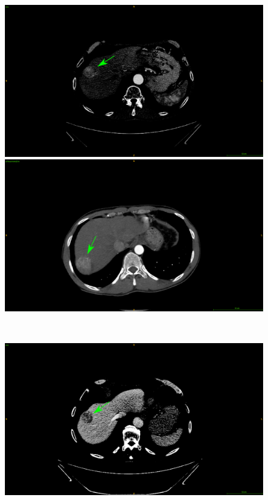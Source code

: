 \documentclass[]{article}
\begin{document}
\begin{figure}[!ht]
	\centering
	\begin{minipage}{0.45\linewidth}
		\includegraphics[width=\linewidth]{../Contributions/images/ImagingTraits/ResizeGDB_washin}
	\end{minipage} \hspace{-0.1cm}
	\begin{minipage}{0.45\linewidth}
		\includegraphics[width=\linewidth]{../Contributions/images/ImagingTraits/ResizeTCIA_washin}
	\end{minipage} \\
	\begin{minipage}{0.45\linewidth}
		\includegraphics[width=\linewidth]{../Contributions/images/ImagingTraits/ResizeGDB_washout}

\end{minipage}
\end{figure}
\end{document}
